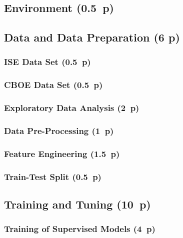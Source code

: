 \subsection{Environment (0.5~p)}\label{sec:environment}

\subsection{Data and Data Preparation (6 p)}\label{sec:data-and-data-preparation}

\subsubsection{ISE Data Set (0.5~p)}\label{sec:ise-data-set}

\subsubsection{CBOE Data Set (0.5~p)}\label{sec:cboe-data-set}

\subsubsection{Exploratory Data Analysis (2~p)}\label{sec:exploratory-data-analysis}

\subsubsection{Data Pre-Processing (1~p)}\label{sec:data-preprocessing}

\subsubsection{Feature Engineering (1.5~p)}\label{sec:feature-engineering}

\subsubsection{Train-Test Split (0.5~p)}\label{sec:train-test-split}

\subsection{Training and Tuning (10~p)}\label{sec:training-and-tuning}

\subsubsection{Training of Supervised
  Models (4~p)}\label{sec:training-of-supervised-models}


